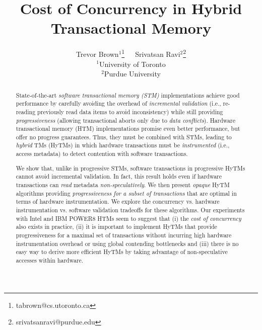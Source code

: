 \documentclass[11pt,pdftex]{article}%
\begin{document}
\title{Cost of Concurrency in Hybrid Transactional Memory}
\author{
Trevor Brown$^1$\thanks{tabrown@cs.utoronto.ca}~~~Srivatsan Ravi$^2$\thanks{srivatsanravi@purdue.edu} \\
$^1$\normalsize University of Toronto\\
$^2$\normalsize Purdue University
}

\date{}
\maketitle

\newcommand{\trevor}[1]{\textbf{[[#1--Trevor]]}}
\newcommand{\sri}[1]{\textbf{[[#1--Sri]]}}
%
\begin{abstract}
State-of-the-art \emph{software transactional memory (STM)} implementations achieve 
good performance by carefully avoiding the overhead of \emph{incremental validation}
(i.e., re-reading previously read data items to avoid inconsistency) while
still providing \emph{progressiveness} (allowing transactional aborts only due to \emph{data conflicts}).
Hardware transactional memory (HTM) implementations promise even better performance, 
but offer no progress guarantees.
Thus, they must be combined with STMs, leading to \emph{hybrid} TMs (HyTMs)
in which hardware transactions must be \emph{instrumented} (i.e., access metadata) 
to detect contention with software transactions.

We show that, unlike in progressive STMs, software transactions in progressive HyTMs
cannot avoid incremental validation.
In fact, this result holds even if hardware transactions can \emph{read} metadata 
\emph{non-speculatively}. 
We then present \emph{opaque} HyTM algorithms providing \emph{progressiveness for a subset of transactions} 
that are  optimal in terms of hardware instrumentation. 
We explore the concurrency vs. hardware instrumentation vs. software validation
tradeoffs for these algorithms.
Our experiments with Intel and IBM POWER8 HTMs   
seem to suggest that (i) the \emph{cost of concurrency} also exists in practice, 
(ii) it is important to implement HyTMs that provide progressiveness for a maximal set of transactions without incurring high hardware instrumentation overhead or
using global contending bottlenecks and (iii) 
there is no easy way to derive more efficient HyTMs by taking advantage of non-speculative accesses within hardware.
\end{abstract}

\newpage
{}\setcounter{page}{2}


%

%

%

%

%


%
%
\newpage
%


\newpage
\appendix


\end{document}
